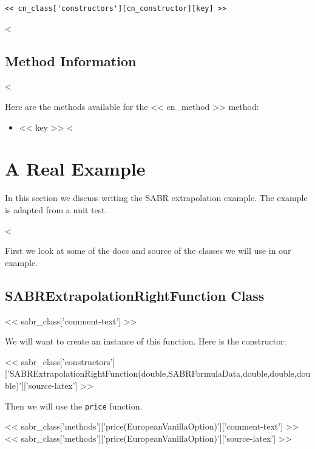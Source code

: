 \begin{Verbatim}
<< cn_class['constructors'][cn_constructor][key] >>
\end{Verbatim}

<%

\subsection{Method Information}

<%

Here are the methods available for the << cn_method >> method:

\begin{itemize}
<%
\item{<< key >>}
<%
\end{itemize}

\section{A Real Example}

In this section we discuss writing the SABR extrapolation example. The example
is adapted from a unit test.

<%

First we look at some of the docs and source of the classes we will use in our
example.

\subsection{SABRExtrapolationRightFunction Class}

<< sabr_class['comment-text'] >>

We will want to create an instance of this function. Here is the constructor:

<< sabr_class['constructors']['SABRExtrapolationRightFunction(double,SABRFormulaData,double,double,double)']['source-latex'] >>

Then we will use the \verb|price| function.

<< sabr_class['methods']['price(EuropeanVanillaOption)']['comment-text'] >>
<< sabr_class['methods']['price(EuropeanVanillaOption)']['source-latex'] >>

